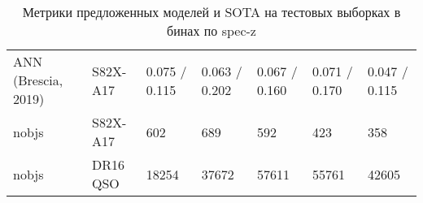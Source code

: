 \begin{table*}
\begin{tabular}{lllllll}
          ANN (Brescia, 2019) &  S82X-A17 &                    0.075 / 0.115 &                    0.063 / 0.202 &                    0.067 / 0.160 &                    0.071 / 0.170 &                    0.047 / 0.115 \\
                        nobjs &  S82X-A17 &                              602 &                              689 &                              592 &                              423 &                              358 \\
                        nobjs &  DR16 QSO &                            18254 &                            37672 &                            57611 &                            55761 &                            42605 \\
    \hline
    \end{tabular}
    
    \caption{Метрики предложенных моделей и SOTA на тестовых выборках в бинах по spec-z}
    \label{tab:metrics-rmag}
\end{table*}
